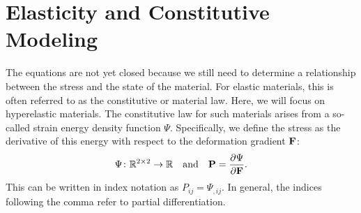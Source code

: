 \section{Elasticity and Constitutive Modeling}

The equations are not yet closed because we still need to determine a relationship between the stress and the state of the material. For elastic materials, this is often referred to as the constitutive or material law. Here, we will focus on hyperelastic materials. The constitutive law for such materials arises from a so-called strain energy density function $\Psi$. Specifically, we define the stress as the derivative of this energy with respect to the deformation gradient $\mathbf{F}$:
\begin{equation*}
\Psi \colon \mathbb{R}^{2\times2} \to \mathbb{R} \quad \text{and} \quad \mathbf{P} = \frac{\partial\Psi}{\partial\mathbf{F}}.
\end{equation*}
This can be written in index notation as $P_{ij} = \Psi_{,ij}$. In general, the indices following the comma refer to partial differentiation.

